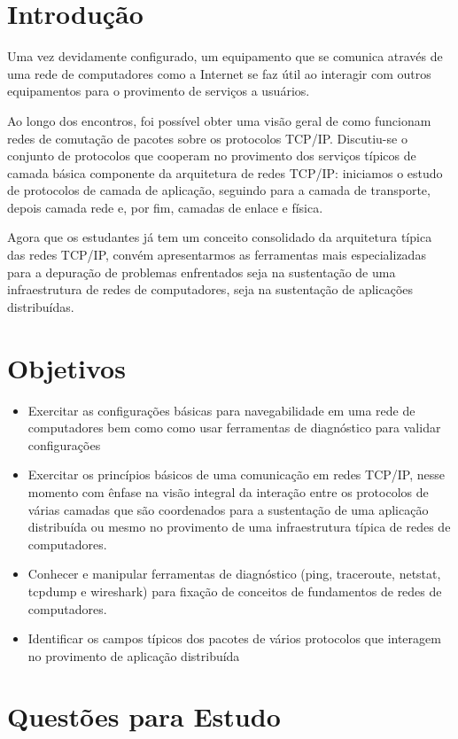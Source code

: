 \section{Introdução}
Uma vez devidamente configurado, um equipamento que se comunica através de uma rede de
computadores como a Internet se faz útil ao interagir com outros equipamentos para o provimento
de serviços a usuários.

Ao longo dos encontros, foi possível obter uma visão geral de como funcionam redes de comutação
de pacotes sobre os protocolos TCP/IP. Discutiu-se o conjunto de protocolos que cooperam no
provimento dos serviços típicos de camada básica componente da arquitetura de redes TCP/IP:
iniciamos o estudo de protocolos de camada de aplicação, seguindo para a camada de transporte,
depois camada rede e, por fim, camadas de enlace e física.

Agora que os estudantes já tem um conceito consolidado da arquitetura típica das redes TCP/IP,
convém apresentarmos as ferramentas mais especializadas para a depuração de problemas
enfrentados seja na sustentação de uma infraestrutura de redes de computadores, seja na sustentação
de aplicações distribuídas.

\section{Objetivos}

\begin{itemize}
  \item Exercitar as configurações básicas para navegabilidade em uma rede de computadores bem como
    como usar ferramentas de diagnóstico para validar configurações
  \item Exercitar os princípios básicos de uma comunicação em redes TCP/IP, nesse momento com
    ênfase na visão integral da interação entre os protocolos de várias camadas que são coordenados
    para a sustentação de uma aplicação distribuída ou mesmo no provimento de uma infraestrutura
    típica de redes de computadores.
  \item Conhecer e manipular ferramentas de diagnóstico (ping, traceroute, netstat,
    tcpdump e wireshark) para fixação de conceitos de fundamentos de redes de
    computadores.
  \item Identificar os campos típicos dos pacotes de vários protocolos que interagem no provimento de
    aplicação distribuída
\end{itemize}

\section{Questões para Estudo}

